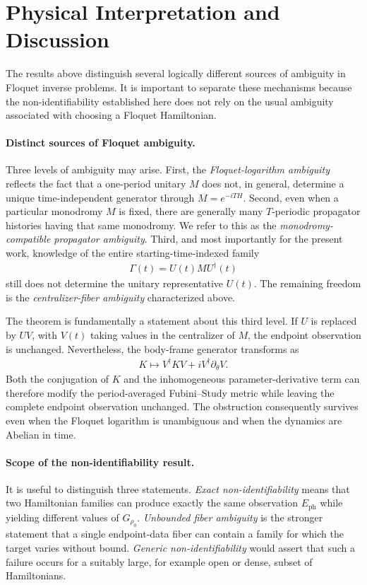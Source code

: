 \documentclass[twocolumn,prl,aps,floatfix]{revtex4-2}
\begin{document}
\section{Physical Interpretation and Discussion}

The results above distinguish several logically different sources of ambiguity in Floquet inverse problems. It is important to separate these mechanisms because the non-identifiability established here does not rely on the usual ambiguity associated with choosing a Floquet Hamiltonian.

\paragraph{Distinct sources of Floquet ambiguity.}
Three levels of ambiguity may arise. First, the \emph{Floquet-logarithm ambiguity} reflects the fact that a one-period unitary $M$ does not, in general, determine a unique time-independent generator through $M=e^{-iTH}$. Second, even when a particular monodromy $M$ is fixed, there are generally many $T$-periodic propagator histories having that same monodromy. We refer to this as the \emph{monodromy-compatible propagator ambiguity}. Third, and most importantly for the present work, knowledge of the entire starting-time-indexed family
\begin{align}
\Gamma(t)=U(t)MU^\dagger(t)
\end{align}
still does not determine the unitary representative $U(t)$. The remaining freedom is the \emph{centralizer-fiber ambiguity} characterized above.

The theorem is fundamentally a statement about this third level. If $U$ is replaced by $UV$, with $V(t)$ taking values in the centralizer of $M$, the endpoint observation is unchanged. Nevertheless, the body-frame generator transforms as
\begin{align}
K\longmapsto
V^\dagger K V+iV^\dagger\partial_\theta V .
\end{align}
Both the conjugation of $K$ and the inhomogeneous parameter-derivative term can therefore modify the period-averaged Fubini--Study metric while leaving the complete endpoint observation unchanged. The obstruction consequently survives even when the Floquet logarithm is unambiguous and when the dynamics are Abelian in time.

\paragraph{Scope of the non-identifiability result.}
It is useful to distinguish three statements. \emph{Exact non-identifiability} means that two Hamiltonian families can produce exactly the same observation $E_{\mathrm{ph}}$ while yielding different values of $G_{\rho_0}$. \emph{Unbounded fiber ambiguity} is the stronger statement that a single endpoint-data fiber can contain a family for which the target varies without bound. \emph{Generic non-identifiability} would assert that such a failure occurs for a suitably large, for example open or dense, subset of Hamiltonians.
\end{document}
